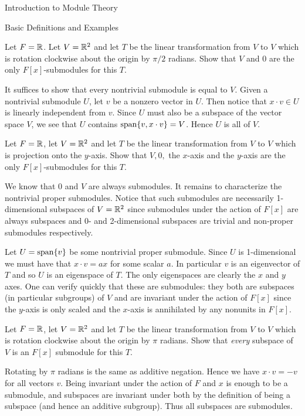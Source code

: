 \begin{chapter}{Introduction to Module Theory}
\begin{section}{Basic Definitions and Examples}
\begin{problem}\label{ex:10.1.18}
Let $F=\mathbb{R}$. Let $V=\mathbb{R}^2$ and let $T$ be the linear transformation from $V$ to $V$ which is rotation clockwise about the origin by $\pi/2$ radians. Show that $V$ and $0$ are the only $F[x]$-submodules for this $T$. 
\end{problem}
\begin{solution}
It suffices to show that every nontrivial submodule is equal to $V$. Given a nontrivial submodule $U$, let $v$ be a nonzero vector in $U$. Then notice that $x\cdot v \in U$ is linearly independent from $v$. Since $U$ must also be a subspace of the vector space $V$, we see that $U$ contains $\operatorname{span}\{v,x\cdot v\} = V$. Hence $U$ is all of $V$.
\end{solution}\oneperpage



\begin{problem}\label{ex:10.1.19}
Let $F=\mathbb{R}$, let $V=\mathbb{R}^2$ and let $T$ be the linear transformation from $V$ to $V$ which is projection onto the $y$-axis. Show that $V,0,$ the $x$-axis and the $y$-axis are the only $F[x]$-submodules for this $T$. 
\end{problem}
\begin{solution}
We know that $0$ and $V$ are always submodules. It remains to characterize the nontrivial proper submodules. Notice that such submodules are necessarily 1-dimensional subspaces of $V = \mathbb{R}^2$ since submodules under the action of $F[x]$ are always subspaces and 0- and 2-dimensional subspaces are trivial and non-proper submodules respectively. 

Let $U = \operatorname{span}\{v\}$ be some nontrivial proper submodule. Since $U$ is 1-dimensional we must have that $x\cdot v = ax$ for some scalar $a$. In particular $v$ is an eigenvector of $T$ and so $U$ is an eigenspace of $T$. The only eigenspaces are clearly the $x$ and $y$ axes. One can verify quickly that these are submodules: they both are subspaces (in particular subgroups) of $V$ and are invariant under the action of $F[x]$ since the $y$-axis is only scaled and the $x$-axis is annihilated by any nonunits in $F[x]$. 
\end{solution}\oneperpage



\begin{problem}\label{ex:10.1.20}
Let $F=\mathbb{R}$, let $V=\mathbb{R}^2$ and let $T$ be the linear transformation from $V$ to $V$ which is rotation clockwise about the origin by $\pi$ radians. Show that \emph{every} subspace of $V$ is an $F[x]$ submodule for this $T$. 
\end{problem}
\begin{solution}
Rotating by $\pi$ radians is the same as additive negation. Hence we have $x\cdot v = -v$ for all vectors $v$. Being invariant under the action of $F$ and $x$ is enough to be a submodule, and subspaces are invariant under both by the definition of being a subspace (and hence an additive subgroup). Thus all subspaces are submodules.
\end{solution}\oneperpage




\end{section}
\end{chapter}
